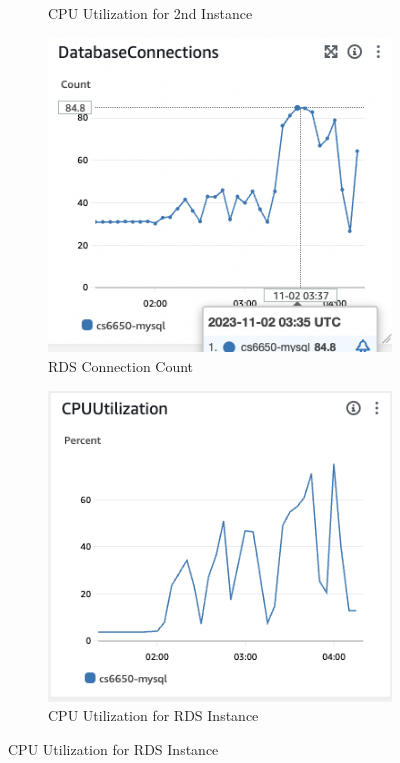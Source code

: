 \documentclass[a4paper,12pt]{article} %
\begin{document}
\begin{enumerate}
\begin{figure}[H]
\begin{subfigure}{.475\linewidth}
        \caption{CPU Utilization for 2nd Instance}
        \label{energydetPSK}
    \end{subfigure}
    
    \medskip %
    \begin{subfigure}{.475\linewidth}
        \includegraphics[width=\linewidth]{images/db_connections.png}
        \caption{RDS Connection Count}
        \label{velcomp}
    \end{subfigure}\hfill %
    \begin{subfigure}{.475\linewidth}
        \includegraphics[width=\linewidth]{images/db_cpu_utilization.png}
        \caption{CPU Utilization for RDS Instance}
        \label{estcomp}
    \end{subfigure}
    

\end{figure}
\end{enumerate}
\end{document}
